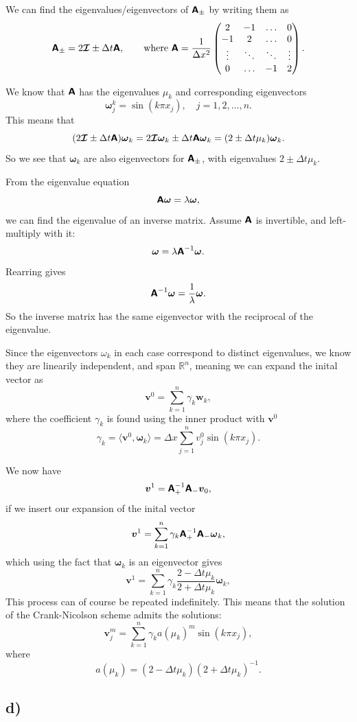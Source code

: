 \documentclass[a4paper, 11pt, notitlepage, english]{article}
\newcommand{\bt}[1]{\boldsymbol{#1}}
\newcommand{\mat}[1]{\textsf{\textbf{#1}}}
\newcommand{\I}{\boldsymbol{\mathcal{I}}}
\begin{document}
We can find the eigenvalues/eigenvectors of $\mat{A}_\pm$ by writing them as
$$\mat{A}_\pm = 2\I \pm \Delta t \mat{A}, \qquad \mbox{where }\mat{A} = \frac{1}{\Delta x^2}\begin{pmatrix}
    2 & -1 &  \ldots & 0 \\
    -1 & 2 & \ldots & 0 \\
    \vdots &  \ddots & \ddots & \vdots \\    0 & \ldots & -1 & 2
\end{pmatrix}. $$ 

We know that $\mat{A}$ has the eigenvalues $\mu_k$ and corresponding eigenvectors 
$$\bt{\omega}_j^k = \sin(k\pi x_j), \quad j=1,2,\ldots,n.$$
This means that
$$(2\I \pm \Delta t\mat{A})\bt{\omega}_k = 2\I\bt{\omega}_k \pm \Delta t\mat{A}\bt{\omega}_k = (2 \pm \Delta t \mu_k)\bt{\omega}_k.$$
So we see that $\bt{\omega}_k$ are also eigenvectors for $\mat{A}_\pm$, with eigenvalues $2\pm\Delta t\mu_k$.

From the eigenvalue equation
$$\mat{A}\bt{\omega} = \lambda \bt{\omega},$$
we can find the eigenvalue of an inverse matrix. Assume $\mat{A}$ is invertible, and left-multiply with it:
$$\bt{\omega} = \lambda \mat{A}^{-1} \bt{\omega}.$$
Rearring gives
$$\mat{A}^{-1} \bt{\omega} = \frac{1}{\lambda}\bt{\omega}.$$
So the inverse matrix has the same eigenvector with the reciprocal of the eigenvalue.

Since the eigenvectors $\omega_{k}$ in each case correspond to distinct eigenvalues, we know they are linearily independent, and span $\mathbb{R}^n$, meaning we can expand the inital vector as
$$\bt{v}^0 = \sum_{k=1}^n \gamma_k \bt{w}_k,$$
where the coefficient $\gamma_k$ is found using the inner product with $\bt{v}^0$
$$\gamma_k = \langle \bt{v}^0, \bt{\omega}_k \rangle = \Delta x \sum_{j=1}^n v_j^0 \sin(k\pi x_j).$$

We now have
$$\bt{v}^{1} = \mat{A}_+^{-1}\mat{A}_- \bt{v}_{0},$$
if we insert our expansion of the inital vector
$$\bt{v}^{1} = \sum_{k=1}^n \gamma_k \mat{A}_+^{-1}\mat{A}_- \bt{\omega}_k,$$
which using the fact that $\bt{\omega}_k$ is an eigenvector gives
$$\bt{v}^{1} = \sum_{k=1}^n \gamma_k \frac{2-\Delta t\mu_k}{2+\Delta t\mu_k} \bt{\omega}_k,$$
This process can of course be repeated indefinitely. This means that the solution of the Crank-Nicolson scheme admits the solutions:
$$\bt{v}^m_j = \sum_{k=1}^n \gamma_k a(\mu_k)^m \sin(k\pi x_j),$$
where
$$a(\mu_k) = (2-\Delta t \mu_k)(2 + \Delta t \mu_k)^{-1}.$$

\subsection*{d)}
\end{document}
